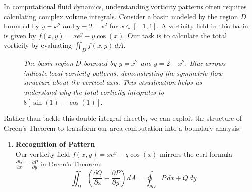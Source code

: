 \exampleline
\begin{example}
In computational fluid dynamics, understanding vorticity patterns often requires calculating complex volume integrals. Consider a basin modeled by the region $D$ bounded by $y=x^2$ and $y=2-x^2$ for $x \in [-1,1]$. A vorticity field in this basin is given by $f(x,y) = xe^y - y\cos(x)$. Our task is to calculate the total vorticity by evaluating $\iint_D f(x,y)\,dA$.

\begin{figure}[H]
\centering
{}
\caption{\textit{The basin region $D$ bounded by $y=x^2$ and $y=2-x^2$. Blue arrows indicate local vorticity patterns, demonstrating the symmetric flow structure about the vertical axis. This visualization helps us understand why the total vorticity integrates to $8[\sin(1) - \cos(1)]$.}}
\label{fig:flow_basin}
\end{figure}

\begin{solution}
\noindent Rather than tackle this double integral directly, we can exploit the structure of Green's Theorem to transform our area computation into a boundary analysis:

\begin{enumerate}
\item \textbf{Recognition of Pattern}\\
Our vorticity field $f(x,y) = xe^y - y\cos(x)$ mirrors the curl formula $\frac{\partial Q}{\partial x} - \frac{\partial P}{\partial y}$ in Green's Theorem:
\[
\iint_D \left(\frac{\partial Q}{\partial x} - \frac{\partial P}{\partial y}\right)\,dA = \oint_{\partial D} P\,dx + Q\,dy
\]


\end{enumerate}
\end{solution}
\end{example}
